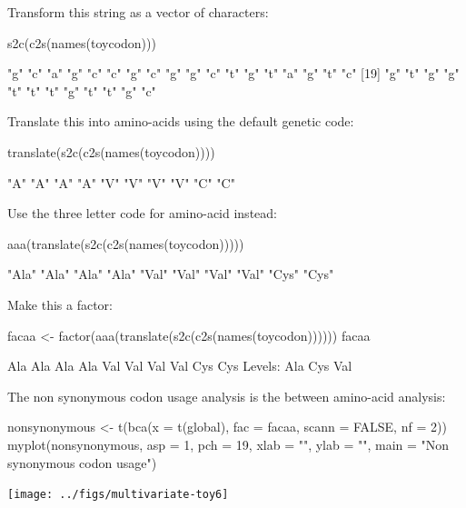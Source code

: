 \documentclass{article}
\begin{document}
Transform this string as a vector of characters:

\begin{Schunk}
\begin{Sinput}
 s2c(c2s(names(toycodon)))
\end{Sinput}
\begin{Soutput}
 [1] "g" "c" "a" "g" "c" "c" "g" "c" "g" "g" "c" "t" "g" "t" "a" "g" "t" "c"
[19] "g" "t" "g" "g" "t" "t" "t" "g" "t" "t" "g" "c"
\end{Soutput}
\end{Schunk}

Translate this into amino-acids using the default genetic code:

\begin{Schunk}
\begin{Sinput}
 translate(s2c(c2s(names(toycodon))))
\end{Sinput}
\begin{Soutput}
 [1] "A" "A" "A" "A" "V" "V" "V" "V" "C" "C"
\end{Soutput}
\end{Schunk}

Use the three letter code for amino-acid instead:

\begin{Schunk}
\begin{Sinput}
 aaa(translate(s2c(c2s(names(toycodon)))))
\end{Sinput}
\begin{Soutput}
 [1] "Ala" "Ala" "Ala" "Ala" "Val" "Val" "Val" "Val" "Cys" "Cys"
\end{Soutput}
\end{Schunk}

Make this a factor:

\begin{Schunk}
\begin{Sinput}
 facaa <- factor(aaa(translate(s2c(c2s(names(toycodon))))))
 facaa
\end{Sinput}
\begin{Soutput}
 [1] Ala Ala Ala Ala Val Val Val Val Cys Cys
Levels: Ala Cys Val
\end{Soutput}
\end{Schunk}

The non synonymous codon usage analysis is the between amino-acid analysis:

\begin{Schunk}
\begin{Sinput}
 nonsynonymous <- t(bca(x = t(global), fac = facaa, scann = FALSE, nf = 2))
 myplot(nonsynonymous, asp = 1, pch = 19, xlab = "", ylab = "", main = "Non synonymous codon usage")
\end{Sinput}
\end{Schunk}
\texttt{[image: ../figs/multivariate-toy6]}
\end{document}
